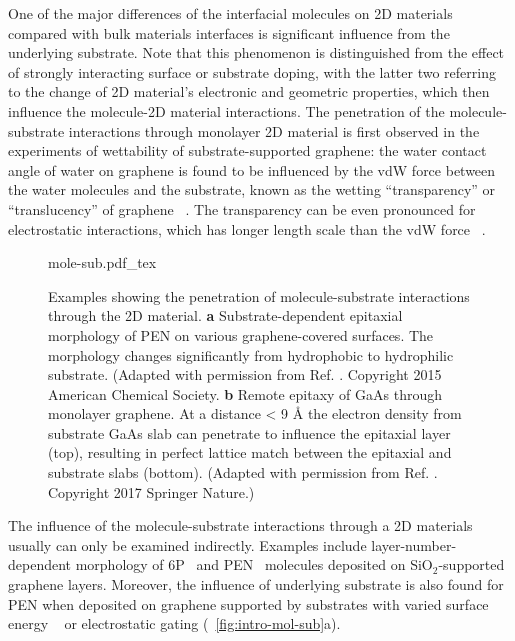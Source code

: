 One of the major differences of the interfacial molecules on 2D
materials compared with bulk materials interfaces is significant
influence from the underlying substrate. Note that this phenomenon is
distinguished from the effect of strongly interacting surface or
substrate doping, with the latter two referring to the change of 2D
material's electronic and geometric properties, which then influence
the molecule-2D material interactions. The penetration of the
molecule-substrate interactions through monolayer 2D material is first
observed in the experiments of wettability of substrate-supported
graphene: the water contact angle of water on graphene is found to be
influenced by the vdW force between the water molecules and the
substrate, known as the wetting ``transparency'' or ``translucency''
of graphene
~\cite{rafiee_2012_transparency,Shih_2012_prl,shih_2013_wetting_natmat}. The
transparency can be even pronounced for electrostatic interactions,
which has longer length scale than the vdW force
~\cite{Shih_2015_PartiallyScreened,Tian_2016_multiscale}.
\begin{figure}[h]
  \centering
  {mole-sub.pdf_tex}
  \caption{\label{fig:intro-mol-sub}%
    Examples showing the penetration of molecule-substrate
    interactions through the 2D material. \textbf{a}
    Substrate-dependent epitaxial morphology of PEN on various
    graphene-covered surfaces. The morphology changes significantly
    from hydrophobic to hydrophilic substrate. (Adapted with
    permission from Ref. \cite{Nguyen_2015_pent_gr_wett}. Copyright 2015
    American Chemical Society. \textbf{b} Remote epitaxy of GaAs
    through monolayer graphene. At a distance < 9 Å the electron
    density from substrate GaAs slab can penetrate to influence the
    epitaxial layer (top), resulting in perfect lattice match between
    the epitaxial and substrate slabs (bottom).  (Adapted with
    permission from Ref. \cite{Kim_2017_remote_epi_Gr}. Copyright 2017
    Springer Nature.)%
  }
\end{figure}
The
influence of the molecule-substrate interactions through a 2D
materials usually can only be examined indirectly.
%
Examples include layer-number-dependent morphology of
6P~\cite{Kratzer_2014_6P_gr_layer} and
PEN~\cite{Chhikara_2014_gr_pent_trans} molecules deposited on
SiO\(_{\text{2}}\)-supported graphene layers. Moreover, the influence
of underlying substrate is also found for PEN when deposited on
graphene supported by substrates with varied surface energy
~\cite{Nguyen_2015_pent_gr_wett} or electrostatic gating
\cite{Nguyen_2019_PEN} (~\autoref{fig:intro-mol-sub}a).
